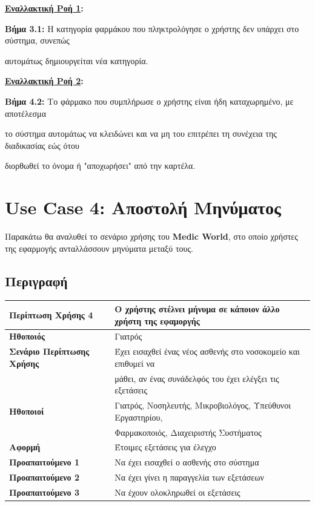 \documentclass{article}
\newcommand\T{\rule{0pt}{2.6ex}}       %
\newcommand\B{\rule[-1.2ex]{0pt}{0pt}}
\begin{document}
 \newpage
 
\textbf{\underline{Εναλλακτική Ροή 1}:} \vspace{0.005cm} \\
\par \textbf{Βήμα 3.1:} Η κατηγορία φαρμάκου που πληκτρολόγησε ο χρήστης δεν υπάρχει στο σύστημα, συνεπώς \par αυτομάτως δημιουργείται νέα κατηγορία.

\vspace{0.3cm}
 
 \textbf{\underline{Εναλλακτική Ροή 2}:} \vspace{0.005cm} \\
\par \textbf{Βήμα 4.2:} Το φάρμακο που συμπλήρωσε ο χρήστης είναι ήδη καταχωρημένο, με αποτέλεσμα \par το σύστημα αυτομάτως να κλειδώνει και να μη του επιτρέπει τη συνέχεια της διαδικασίας εώς ότου \par διορθωθεί το όνομα ή "αποχωρήσει" από την καρτέλα.

\section{Use Case 4: Αποστολή Μηνύματος}

Παρακάτω θα αναλυθεί το σενάριο χρήσης του \textbf{Medic World}, στο οποίο χρήστες της εφαρμογής ανταλλάσσουν μηνύματα μεταξύ τους.

\subsection{Περιγραφή}

\begin{center}
     \begin{tabular}{|l|l|}
     \hline
      \textbf{Περίπτωση Χρήσης 4} & Ο χρήστης στέλνει μήνυμα σε κάποιον άλλο χρήστη της εφαμοργής \T\B \\ 
      \hline
      \textbf{Ηθοποιός} & Γιατρός \T\B \\
      \hline
      \textbf{Σενάριο Περίπτωσης Χρήσης} & Έχει εισαχθεί ένας νέος ασθενής στο νοσοκομείο και επιθυμεί να \T \\& μάθει, αν ένας συνάδελφός του έχει ελέγξει τις εξετάσεις \B \\
      \hline
      \textbf{Ηθοποιοί} & Γιατρός, Νοσηλευτής, Μικροβιολόγος, Υπεύθυνοι Εργαστηρίου, \T \\& Φαρμακοποιός, Διαχειριστής Συστήματος \T\B \\
      \hline
      \textbf{Αφορμή} & Έτοιμες εξετάσεις για έλεγχο \T\B \\
      \hline
      \textbf{Προαπαιτούμενο 1} & Να έχει εισαχθεί ο ασθενής στο σύστημα \T\B \\
      \hline
      \textbf{Προαπαιτούμενο 2} & Να έχει γίνει η παραγγελία των εξετάσεων \T\B \\
      \hline
      \textbf{Προαπαιτούμενο 3} & Να έχουν ολοκληρωθεί οι εξετάσεις \T\B \\
      \hline
     \end{tabular}
 \end{center}
\end{document}
